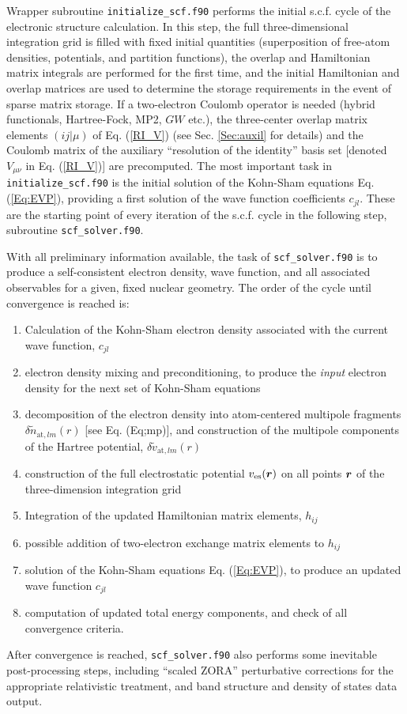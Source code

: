 Wrapper subroutine \texttt{initialize\_scf.f90} performs the initial
s.c.f. cycle of the electronic structure calculation. In this step,
the full three-dimensional integration grid is filled with fixed
initial quantities (superposition of free-atom densities, 
potentials, and partition functions), the overlap and Hamiltonian
matrix integrals are performed for the first time, and the initial
Hamiltonian and overlap matrices are used to determine the storage
requirements in the event of sparse matrix storage. If a two-electron
Coulomb operator is needed (hybrid functionals, Hartree-Fock, MP2,
$GW$ etc.), the three-center overlap matrix elements $(ij|\mu)$ of
Eq. (\ref{RI_V}) (see Sec. \ref{Sec:auxil} for details) and the
Coulomb matrix of the auxiliary ``resolution of the identity'' basis set
[denoted $V_{\mu\nu}$ in Eq. (\ref{RI_V})] are precomputed. 
The most important task in \texttt{initialize\_scf.f90} is the initial
solution of the Kohn-Sham equations Eq. (\ref{Eq:EVP}), providing a
first solution of the wave function coefficients $c_{jl}$. These are
the starting point of every iteration of the s.c.f. cycle in the
following step, subroutine \texttt{scf\_solver.f90}. 

With all preliminary information  available, the task of
\texttt{scf\_solver.f90} is to produce a self-consistent electron
density, wave function, and all associated observables for a given,
fixed nuclear geometry. The order of the cycle until convergence is
reached is: 
\begin{enumerate}
  \item Calculation of the Kohn-Sham electron density associated with the
    current wave function, $c_{jl}$ 
  \item electron density mixing and preconditioning, to produce the
    \emph{input} electron density for the next set of Kohn-Sham
    equations
  \item decomposition of the electron density into atom-centered
    multipole fragments $\delta\tilde{n}_{\text{at},lm}(r)$ [see
    Eq. (Eq;mp)], and construction of the multipole components of the
    Hartree potential, $\delta\tilde{v}_{\text{at},lm}(r)$
  \item construction of the full electrostatic potential
    $v_\text{es}(\mbox{\boldmath$r$})$ on all points $\mbox{\boldmath$r$}$ of the
    three-dimension integration grid
  \item Integration of the updated Hamiltonian matrix elements,
    $h_{ij}$
  \item possible addition of two-electron exchange matrix elements to
    $h_{ij}$
  \item solution of the Kohn-Sham equations Eq. (\ref{Eq:EVP}), to
    produce an updated wave function $c_{jl}$
  \item computation of updated total energy components, and check of
    all convergence criteria.  
\end{enumerate}
After convergence is reached, \texttt{scf\_solver.f90} also performs
some inevitable post-processing steps, including ``scaled ZORA''
perturbative corrections for the appropriate relativistic treatment,
and band structure and density of states data output.

